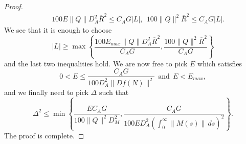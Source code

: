 \documentclass[11pt, leqno]{amsart}
\theoremstyle{definition}
\begin{document}
\begin{proof}
\begin{align*}
& \ \ \  {100 E \|Q\| D_A^2  \overline{R}^2} \leq {C_AG |L|},\ \  {100 \|Q\|^2 \overline{R}^2  } \leq {C_AG}{|L|} .
\end{align*}
We see that it is enough to choose
$$
|L| \geq \max\left\{ \frac{100 E_{max} \|Q\| D_A^2\overline{R}^2}{C_AG},\frac{100 \|Q\|^2\overline{R}^2}{C_AG} \right\}
$$
and the last two inequalities hold. We are now free to pick $E$ which satisfies
$$
0 < E \leq \frac{C_AG}{100 D_A^2 \|Df(N)\|^2}\ \ \textrm{and}\ \ E< E_{max},
$$
and we finally need to pick $\Delta$ such that
$$
\Delta^2 \leq \min \left\{  \frac{EC_AG}{100 \|Q\|^2 D_M^2}, \frac{C_AG}{100 E D_A^2\left(\int_0^\infty\|M(s)\|\, ds\right)^2} \right\}.
$$
The proof is complete.
\end{proof}

%
%
\end{document}
